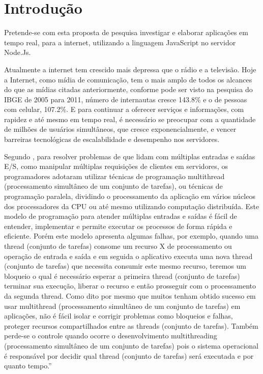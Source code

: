 \chapter{Introdução}
\label{introducao}

\vspace{-1.9cm}

  
  Pretende-se com esta proposta de pesquisa investigar e elaborar aplicações em tempo real, 
  para a internet, utilizando a linguagem JavaScript no servidor Node.Js.
  
  Atualmente a internet tem crescido mais depressa que o rádio e a televisão. 
  Hoje a Internet, como mídia de comunicação, tem o mais amplo de todos os alcances do que as mídias 
  citadas anteriormente, conforme pode ser visto na pesquisa do IBGE de 2005 para 2011, 
  número de internautas cresce 143.8\%  e o de pessoas com celular, 107.2\%. 
  E para continuar a oferecer serviços e informações, com rapidez e até mesmo em tempo real, 
  é necessário se preocupar com a quantidade de milhões de usuários simultâneos, 
  que cresce exponencialmente, e vencer barreiras tecnológicas de escalabilidade e desempenho nos servidores.
  
  Segundo , para resolver problemas de que lidam com múltiplas entradas e saídas \ac{E/S},
  como manipular múltiplas requisições de clientes em servidores, os programadores adotaram utilizar técnicas 
  de programação multithread (processamento simultâneo de um conjunto de tarefas), 
  ou técnicas de programação paralela, dividindo o processamento da aplicação em vários núcleos 
  dos processadores da CPU ou até mesmo utilizando computação distribuída. 
  Este modelo de programação para atender múltiplas entradas e saídas é fácil de entender, 
  implementar e permite executar os processos de forma rápida e eficiente. 
  Porém este modelo apresenta algumas falhas, por exemplo, quando uma thread (conjunto de tarefas) 
  consome um recurso X de processamento ou operação de entrada e saída e em seguida o aplicativo executa uma nova 
  thread (conjunto de tarefas) que necessita consumir este mesmo recurso, 
  teremos um bloqueio o qual é necessário esperar a primeira thread (conjunto de tarefas) 
  terminar sua execução, liberar o recurso e então prosseguir com o processamento da segunda thread. 
  Como dito por  mesmo que muitos tenham obtido sucesso em usar 
  multithread (processamento simultâneo de um conjunto de tarefas) em aplicações, 
  não é fácil isolar e corrigir problemas como bloqueios e falhas, 
  proteger recursos compartilhados entre as threads (conjunto de tarefas). 
  Também perde-se o controle quando ocorre o desenvolvimento 
  multithreading (processamento simultâneo de um conjunto de tarefas) pois o sistema operacional é responsável 
  por decidir qual thread (conjunto de tarefas) será executada e por quanto tempo.''~\cite[p. 80]{Tilkov:2010}
  
